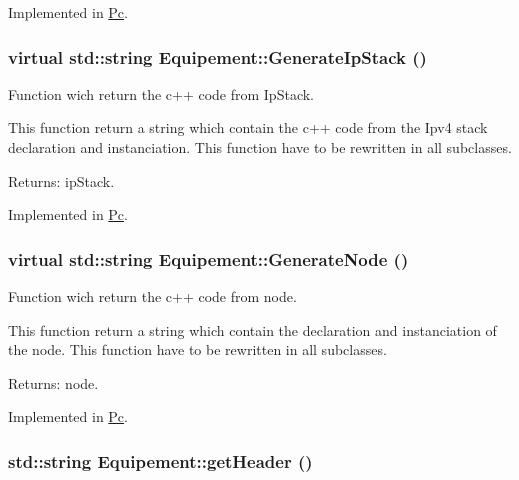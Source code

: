 Implemented in \hyperlink{class_pc_85794eaecd61612d44e1c68746e1c156}{Pc}.\hypertarget{class_equipement_98eda1e24e07c343712dcd35eba6bd18}{
\subsubsection[{GenerateIpStack}]{\setlength{\rightskip}{0pt plus 5cm}virtual std::string Equipement::GenerateIpStack ()}}
\label{class_equipement_98eda1e24e07c343712dcd35eba6bd18}


Function wich return the c++ code from IpStack. 

This function return a string which contain the c++ code from the Ipv4 stack declaration and instanciation. This function have to be rewritten in all subclasses.

\begin{Desc}
\item[Returns:]ipStack. \end{Desc}


Implemented in \hyperlink{class_pc_6b81e7a8e167ed51f92ce55c0447fefe}{Pc}.\hypertarget{class_equipement_e03cafed5e059dfe332643719c8d8dd4}{
\subsubsection[{GenerateNode}]{\setlength{\rightskip}{0pt plus 5cm}virtual std::string Equipement::GenerateNode ()}}
\label{class_equipement_e03cafed5e059dfe332643719c8d8dd4}


Function wich return the c++ code from node. 

This function return a string which contain the declaration and instanciation of the node. This function have to be rewritten in all subclasses.

\begin{Desc}
\item[Returns:]node. \end{Desc}


Implemented in \hyperlink{class_pc_36ace04642cd481b39d312b51c37c114}{Pc}.\hypertarget{class_equipement_c4aa745380e69d02a91f1e601430a545}{
\subsubsection[{getHeader}]{\setlength{\rightskip}{0pt plus 5cm}std::string Equipement::getHeader ()}}
\label{class_equipement_c4aa745380e69d02a91f1e601430a545}


